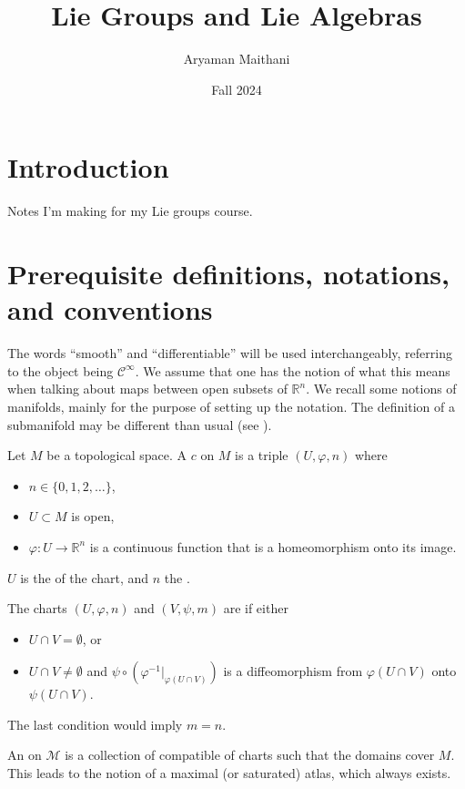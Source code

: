 \documentclass[12pt]{article}
\title{Lie Groups and Lie Algebras}
\author{Aryaman Maithani}
\date{Fall 2024}
\begin{document}
\maketitle
\tableofcontents

\section*{Introduction}

Notes I'm making for my Lie groups course. 

\section{Prerequisite definitions, notations, and conventions}

The words ``smooth'' and ``differentiable'' will be used interchangeably, referring to the object being $\mathcal{C}^{\infty}$. 
We assume that one has the notion of what this means when talking about maps between open subsets of $\mathbb{R}^{n}$. 
We recall some notions of manifolds, mainly for the purpose of setting up the notation. \newline
The definition of a submanifold may be different than usual (see ).

Let $M$ be a topological space. A  $c$ on $M$ is a triple $(U, \varphi, n)$ where
\begin{itemize}
	\item $n \in \{0, 1, 2, \ldots\}$,
	\item $U \subset M$ is open,
	\item $\varphi \colon U \to \mathbb{R}^{n}$ is a continuous function that is a homeomorphism onto its image.
\end{itemize}
$U$ is the  of the chart, and $n$ the . 

The charts $(U, \varphi, n)$ and $(V, \psi, m)$ are  if either
\begin{itemize}
	\item $U \cap V = \emptyset$, or
	\item $U \cap V \neq \emptyset$ and $\psi \circ \left(\varphi^{-1}|_{\varphi(U \cap V)}\right)$ is a diffeomorphism from $\varphi(U \cap V)$ onto $\psi(U \cap V)$.
\end{itemize}
The last condition would imply $m = n$. 

An  on $\mathcal{M}$ is a collection of compatible of charts such that the domains cover $M$. 
This leads to the notion of a maximal (or saturated) atlas, which always exists. 
\end{document}
